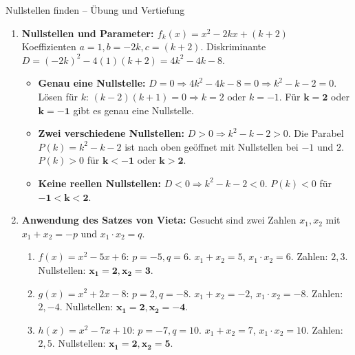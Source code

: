 \begin{loesungsumgebung}{Nullstellen finden – Übung und Vertiefung}
\begin{enumerate}[label=(\alph*)]
    \item \textbf{Nullstellen und Parameter: $f_k(x) = x^2 - 2kx + (k+2)$} \\
    Koeffizienten $a=1, b=-2k, c=(k+2)$.
    Diskriminante $D = (-2k)^2 - 4(1)(k+2) = 4k^2 - 4k - 8$.
    \begin{itemize}
        \item \textbf{Genau eine Nullstelle:} $D=0 \Rightarrow 4k^2 - 4k - 8 = 0 \Rightarrow k^2 - k - 2 = 0$.
        Lösen für $k$: $(k-2)(k+1)=0 \Rightarrow k=2$ oder $k=-1$.
        Für $\mathbf{k=2}$ oder $\mathbf{k=-1}$ gibt es genau eine Nullstelle.
        \item \textbf{Zwei verschiedene Nullstellen:} $D>0 \Rightarrow k^2 - k - 2 > 0$.
        Die Parabel $P(k)=k^2-k-2$ ist nach oben geöffnet mit Nullstellen bei $-1$ und $2$.
        $P(k)>0$ für $\mathbf{k < -1}$ oder $\mathbf{k > 2}$.
        \item \textbf{Keine reellen Nullstellen:} $D<0 \Rightarrow k^2 - k - 2 < 0$.
        $P(k)<0$ für $\mathbf{-1 < k < 2}$.
    \end{itemize}

    \item \textbf{Anwendung des Satzes von Vieta:}
    Gesucht sind zwei Zahlen $x_1, x_2$ mit $x_1+x_2 = -p$ und $x_1 \cdot x_2 = q$.
    \begin{enumerate}[label=(\roman*)]
        \item $f(x) = x^2 - 5x + 6$: $p=-5, q=6$.
        $x_1+x_2 = 5$, $x_1 \cdot x_2 = 6$. Zahlen: $2, 3$. Nullstellen: $\mathbf{x_1=2, x_2=3}$.
        \item $g(x) = x^2 + 2x - 8$: $p=2, q=-8$.
        $x_1+x_2 = -2$, $x_1 \cdot x_2 = -8$. Zahlen: $2, -4$. Nullstellen: $\mathbf{x_1=2, x_2=-4}$.
        \item $h(x) = x^2 - 7x + 10$: $p=-7, q=10$.
        $x_1+x_2 = 7$, $x_1 \cdot x_2 = 10$. Zahlen: $2, 5$. Nullstellen: $\mathbf{x_1=2, x_2=5}$.
    \end{enumerate}
\end{enumerate}

\end{loesungsumgebung}


